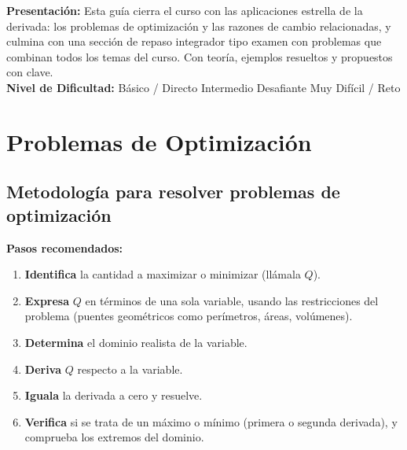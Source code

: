 \documentclass[12pt, letterpaper]{article}
\begin{document}

\vspace{4pt}
\begin{cuadroinfo}
  \small
  \textbf{Presentación:} Esta guía cierra el curso con las aplicaciones estrella de la derivada: los problemas de optimización y las razones de cambio relacionadas, y culmina con una sección de repaso integrador tipo examen con problemas que combinan todos los temas del curso. Con teoría, ejemplos resueltos y propuestos con clave.
  \\[4pt]
  \textbf{Nivel de Dificultad:}\quad
  \facil{} Básico / Directo \quad
  \medio{} Intermedio \quad
  \dificil{} Desafiante \quad
  \muyDificil{} Muy Difícil / Reto
\end{cuadroinfo}

\vspace{8pt}

\section{Problemas de Optimización}

\subsection{Metodología para resolver problemas de optimización}

\begin{cuadroteoria}
  \textbf{Pasos recomendados:}
  \begin{enumerate}
    \item \textbf{Identifica} la cantidad a maximizar o minimizar (llámala $Q$).
    \item \textbf{Expresa} $Q$ en términos de una sola variable, usando las restricciones del problema (puentes geométricos como perímetros, áreas, volúmenes).
    \item \textbf{Determina} el dominio realista de la variable.
    \item \textbf{Deriva} $Q$ respecto a la variable.
    \item \textbf{Iguala} la derivada a cero y resuelve.
    \item \textbf{Verifica} si se trata de un máximo o mínimo (primera o segunda derivada), y comprueba los extremos del dominio.
  \end{enumerate}
\end{cuadroteoria}
\end{document}
